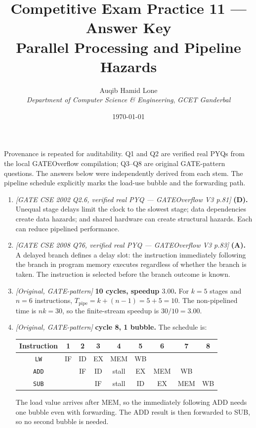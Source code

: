 \documentclass[11pt]{article}
\title{Competitive Exam Practice 11 --- Answer Key\\
  \large Parallel Processing and Pipeline Hazards}
\author{Auqib Hamid Lone\\[0.3em]
  \emph{Department of Computer Science \& Engineering}, \emph{GCET Ganderbal}}
\date{\today}
\begin{document}
\maketitle

\begin{sloppypar}
\noindent Provenance is repeated for auditability. Q1 and Q2 are verified real
PYQs from the local GATEOverflow compilation; Q3--Q8 are original GATE-pattern
questions. The answers below were independently derived from each stem. The
pipeline schedule explicitly marks the load-use bubble and the forwarding path.
\end{sloppypar}

\begin{enumerate}
\item[\textbf{Q1}] \textit{[GATE CSE 2002 Q2.6, verified real PYQ ---
GATEOverflow V3 p.81]} \textbf{(D).} Unequal stage delays limit the clock to
the slowest stage; data dependencies create data hazards; and shared hardware
can create structural hazards. Each can reduce pipelined performance.

\item[\textbf{Q2}] \textit{[GATE CSE 2008 Q76, verified real PYQ ---
GATEOverflow V3 p.83]} \textbf{(A).} A delayed branch defines a delay slot:
the instruction immediately following the branch in program memory executes
regardless of whether the branch is taken. The instruction is selected before
the branch outcome is known.

\item[\textbf{Q3}] \textit{[Original, GATE-pattern]} \textbf{10 cycles,
speedup $3.00$.} For $k=5$ stages and $n=6$ instructions,
$T_{\mathrm{pipe}}=k+(n-1)=5+5=10$. The non-pipelined time is $nk=30$,
so the finite-stream speedup is $30/10=3.00$.

\item[\textbf{Q4}] \textit{[Original, GATE-pattern]} \textbf{cycle 8,
1 bubble.} The schedule is:
\begin{center}
\begin{tabular}{c|cccccccc}
\textbf{Instruction} & 1 & 2 & 3 & 4 & 5 & 6 & 7 & 8 \\
\hline
\texttt{LW}  & IF & ID & EX & MEM & WB & & & \\
\texttt{ADD} & & IF & ID & stall & EX & MEM & WB & \\
\texttt{SUB} & & & IF & stall & ID & EX & MEM & WB
\end{tabular}
\end{center}
The load value arrives after MEM, so the immediately following ADD needs one
bubble even with forwarding. The ADD result is then forwarded to SUB, so no
second bubble is needed.


\end{enumerate}
\end{document}
